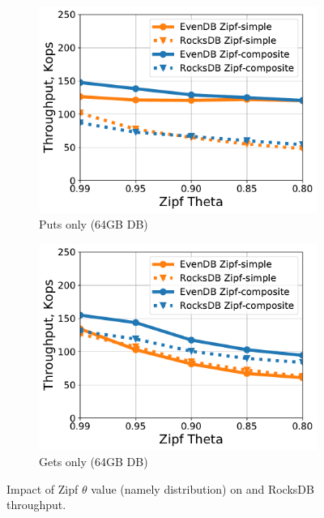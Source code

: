 \begin{figure}[t]
	\centering
	\begin{subfigure}{0.49\linewidth}
		\includegraphics[width=\textwidth]{figs/puts_only_skew_line.pdf}
		\caption{Puts only (64GB DB)}
		\label{fig:puts_only_skew}
	\end{subfigure}
	\begin{subfigure}{0.49\linewidth}
		\includegraphics[width=\textwidth]{figs/gets_only_skew_line.pdf}
		\caption{Gets only (64GB DB)}
		\label{fig:gets_only_skew}
	\end{subfigure}
	\caption{{Impact of Zipf $\theta$ value (namely distribution) on \sys\/ and RocksDB throughput.}}
	\label{fig:skew_impact}
\end{figure}


